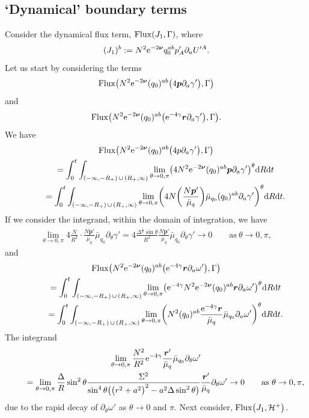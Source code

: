 \documentclass[11pt]{article}
\numberwithin{equation}{section}
\def\ptl{\partial}%
\def\mbo#1{\boldsymbol{#1}}%
\def\halb{\frac{1}{2}}%
\numberwithin{equation}{section}
\begin{document}
\subsection*{`Dynamical' boundary terms}
Consider the dynamical flux term, ${\rm Flux} (J_1, \Gamma)$, where
\[
(J_1)^b := N^2 {\rm e}^{-2 \mbo{\nu}} q^{ab}_0 p'_A \ptl_a U'^A.
\]
Let us start by considering the terms
\[
{\rm Flux} \bigl(N^2 {\rm e}^{-2 \mbo{\nu}} (q_0)^{ab} \bigl(4 \mbo{p} \ptl_a \gamma' \bigr), \Gamma\bigr)
\]
 and
 \[
 {\rm Flux} \bigl(N^2 {\rm e}^{-2 \mbo{\nu}} (q_0)^{ab} \bigl({\rm e}^{-4 \gamma} \mbo{r} \ptl_a \gamma' \bigr), \Gamma\bigr).
 \]
We have
\begin{gather*}
{\rm Flux} \bigl(N^2 {\rm e}^{-2 \mbo{\nu}} (q_0)^{ab} \bigl(4p \ptl_a \gamma' \bigr), \Gamma\bigr) \\
\qquad{} = \int^t_0 \int_{ (-\infty, -R_+) \, \cup\, (R_+, \infty) } \lim_{\theta \to 0, \pi} \bigl(4 N^2 {\rm e}^{-2 \mbo{\nu}} (q_0)^{ab} \mbo{p} \ptl_a \gamma'\bigr)^\theta {\rm d}R {\rm d}t \notag\\
\qquad{}= \int^t_0 \int_{ (-\infty, -R_+) \, \cup\, (R_+, \infty) } \lim_{\theta \to 0, \pi} \biggl(4 N \biggl(\frac{ N\mbo{p}'}{\bar{\mu}_q} \biggr) \bar{\mu}_{q_0} (q_0)^{ab} \ptl_a \gamma' \biggr)^\theta {\rm d}R {\rm d}t. \notag
 \end{gather*}
If we consider the integrand, within the domain of integration, we have
 \begin{gather*}
 \lim_{\theta \to 0, \pi}4 \frac{N}{R^2} \cdot \frac{N \mbo{p}'}{\bar{\mu}_q} \bar{\mu}_{q_0} \ptl_\theta \gamma' = 4 \frac{\Delta^\halb \sin \theta}{R^2} \frac{N \mbo{p}'}{\bar{\mu}_q} \bar{\mu}_{q_0} \ptl_\theta \gamma'
 \to 0 \qquad \text{as} \ \theta \to 0, \pi,
\end{gather*}
and
\begin{gather*}
 {\rm Flux} \bigl(N^2 {\rm e}^{-2 \mbo{\nu}} (q_0)^{ab} \bigl({\rm e}^{-4 \gamma} \mbo{r} \ptl_a \omega' \bigr), \Gamma\bigr) \\
 \qquad{}= \int^t_0 \int_{ (-\infty, -R_+) \, \cup\, (R_+, \infty) } \lim_{\theta \to 0, \pi} \bigl( {\rm e}^{-4\gamma } N^2 {\rm e}^{-2 \mbo{\nu}} (q_0)^{ab} \mbo{r} \ptl_a \omega' \bigr)^\theta {\rm d}R {\rm d}t \notag\\
 \qquad{}= \int^t_0 \int_{ (-\infty, -R_+) \, \cup\, (R_+, \infty) } \lim_{\theta \to 0, \pi} \biggl( N^2 (q_0)^{ab} \frac{{\rm e}^{-4\gamma }\mbo{r}}{\bar{\mu}_q} \bar{\mu}_{q_0}\ptl_a \omega' \biggr)^\theta {\rm d}R {\rm d}t.
 \end{gather*}
The integrand
\begin{gather*}
 \lim_{\theta \to 0, \pi} \frac{N^2}{R^2} {\rm e}^{-4\gamma} \frac{\mbo{r}'}{\bar{\mu}_q} \bar{\mu}_{q_0} \ptl_\theta \omega' \notag\\
 \qquad{}= \lim_{\theta \to 0, \pi} \frac{\Delta}{R} \sin^2 \theta\frac{\Sigma^2}{\sin^4 \theta \bigl(\bigl(r^2+a^2\bigr)^2 -a^2 \Delta \sin^2 \theta\bigr)} \frac{\mbo{r}'}{\bar{\mu}_q} \ptl_\theta \omega'
 \to 0 \qquad \text{as} \ \theta \to 0, \pi,
\end{gather*}
due to the rapid decay of $\ptl_\theta \omega'$ as $\theta \to 0$ and $\pi$.
Next consider, ${\rm Flux} \bigl(J_1, \mathcal{H}^+\bigr)$.
\end{document}
